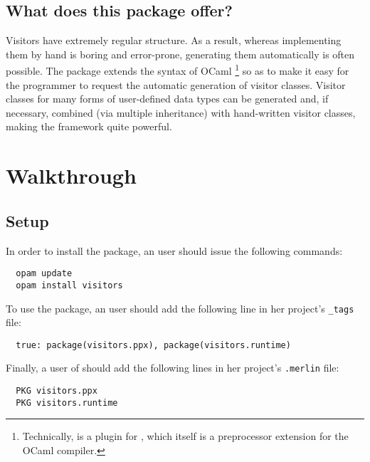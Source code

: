 \documentclass[11pt,a4paper,twoside]{article}
\begin{document}

\subsection{What does this package offer?}

Visitors have extremely regular structure. As a result, whereas implementing
them by hand is boring and error-prone, generating them automatically is often
possible. The \visitors package extends the syntax of OCaml%
%
\footnote{Technically, \visitors is a plugin for \ppxderiving, which itself is
  a preprocessor extension for the OCaml compiler.}
%
so as to make it easy for the programmer to request the automatic generation
of visitor classes. Visitor classes for many forms of user-defined data types
can be generated and, if necessary, combined (via multiple inheritance) with
hand-written visitor classes, making the framework quite powerful.


\section{Walkthrough}


\subsection{Setup}
\label{sec:intro:setup}

In order to install the \visitors package, an \opam user should issue the
following commands:
\begin{verbatim}
  opam update
  opam install visitors
\end{verbatim}
To use the package, an \ocamlbuild user should add the
following line in her project's \texttt{\_tags} file:
\begin{lstlisting}
  true: package(visitors.ppx), package(visitors.runtime)
\end{lstlisting}
Finally, a user of \merlin should add the following lines in her project's
\texttt{.merlin} file:
\begin{lstlisting}
  PKG visitors.ppx
  PKG visitors.runtime
\end{lstlisting}
\end{document}
